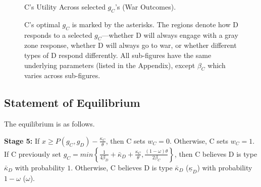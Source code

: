 \documentclass[11pt,letterpaper,pdftex,dvipsnames,table]{article}
\begin{document}
\begin{figure}


\caption{C's Utility Across selected $g_C$'s (War Outcomes).}\label{constraints2}
\caption*{ C's optimal $g_C$ is marked by the asterisks. The regions denote how D responds to a selected $g_C$---whether D will always engage with a gray zone response, whether D will always go to war, or whether  different types of D respond differently. All sub-figures have the same underlying parameters (listed in the Appendix), except $\beta_C$ which varies across sub-figures.}
\end{figure}

\subsection{Statement of Equilibrium}

The equilibrium is as follows.

\textbf{Stage 5:} If $x\geq P(g_{C},g_{D})-\frac{\kappa_{C}}{\theta}$, then C sets $w_{C}=0$. Otherwise, C sets $w_{C}=1$. If C previously set $g_{C}=min\left\{ \frac{1}{4\beta_{D}}+\bar{\kappa}_{D}+\frac{\kappa_{C}}{\theta},\frac{(1-\omega)\theta}{2\beta_{C}}\right\} $, then C believes D is type $\bar{\kappa}_{D}$ with probability $1$. Otherwise, C believes D is type $\bar{\kappa}_{D}$ ($\underline{\kappa}_{D}$) with probability $1-\omega$ ($\omega$).
\end{document}
